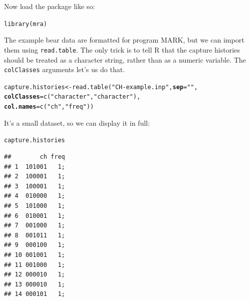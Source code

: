 \documentclass[12pt]{article}\usepackage[]{graphicx}\usepackage[]{color}
\makeatletter
\newcommand{\hlstr}[1]{\textcolor[rgb]{0.749,0.012,0.012}{#1}}%
\newcommand{\hlstd}[1]{\textcolor[rgb]{0,0,0}{#1}}%
\newcommand{\hlkwb}[1]{\textcolor[rgb]{0,0.341,0.682}{#1}}%
\newcommand{\hlkwc}[1]{\textcolor[rgb]{0,0,0}{\textbf{#1}}}%
\newcommand{\hlkwd}[1]{\textcolor[rgb]{0.004,0.004,0.506}{#1}}%
\newenvironment{kframe}{%
 \def\at@end@of@kframe{}%
 \ifinner\ifhmode%
  \def\at@end@of@kframe{\end{minipage}}%
  \begin{minipage}{\columnwidth}%
 \fi\fi%
 \def\FrameCommand##1{\hskip\@totalleftmargin \hskip-\fboxsep
 \colorbox{shadecolor}{##1}\hskip-\fboxsep
     \hskip-\linewidth \hskip-\@totalleftmargin \hskip\columnwidth}%
 \MakeFramed {\advance\hsize-\width
   \@totalleftmargin\z@ \linewidth\hsize
   \@setminipage}}%
 {\par\unskip\endMakeFramed%
 \at@end@of@kframe}
\newenvironment{knitrout}{}{} %
\newcommand{\inr}[1]{\colorbox{inlinecolor}{\texttt{#1}}}
\makeatother
\begin{document}
Now load the package like so: 

\begin{knitrout}
\color{fgcolor}\begin{kframe}
\begin{alltt}
\hlkwd{library}\hlstd{(mra)}
\end{alltt}
\end{kframe}
\end{knitrout}

The example bear data are formatted for program MARK, but we can
import them using  \inr{read.table}. The only trick is to tell R that
the capture histories should be treated as a character string, rather
than as a numeric variable. The \inr{colClasses} arguments let's us do
that. 

\begin{knitrout}
\color{fgcolor}\begin{kframe}
\begin{alltt}
\hlstd{capture.histories} \hlkwb{<-} \hlkwd{read.table}\hlstd{(}\hlstr{"CH-example.inp"}\hlstd{,} \hlkwc{sep}\hlstd{=}\hlstr{" "}\hlstd{,}
                                \hlkwc{colClasses}\hlstd{=}\hlkwd{c}\hlstd{(}\hlstr{"character"}\hlstd{,} \hlstr{"character"}\hlstd{),}
                                \hlkwc{col.names}\hlstd{=}\hlkwd{c}\hlstd{(}\hlstr{"ch"}\hlstd{,} \hlstr{"freq"}\hlstd{))}
\end{alltt}
\end{kframe}
\end{knitrout}



It's a small dataset, so we can display it in full:

\begin{knitrout}
\color{fgcolor}\begin{kframe}
\begin{alltt}
\hlstd{capture.histories}
\end{alltt}
\begin{verbatim}
##        ch freq
## 1  101001   1;
## 2  100001   1;
## 3  100001   1;
## 4  010000   1;
## 5  101000   1;
## 6  010001   1;
## 7  001000   1;
## 8  001011   1;
## 9  000100   1;
## 10 001001   1;
## 11 001000   1;
## 12 000010   1;
## 13 000010   1;
## 14 000101   1;
\end{verbatim}
\end{kframe}
\end{knitrout}
\end{document}
